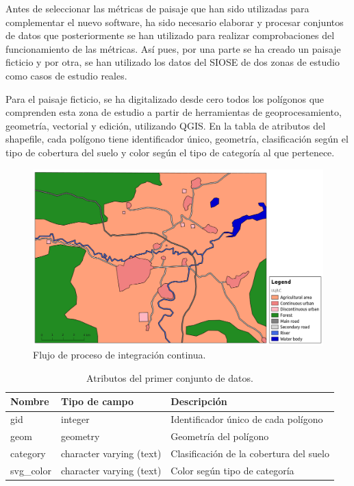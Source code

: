 Antes de seleccionar las métricas de paisaje que han sido utilizadas para complementar el nuevo software, ha sido necesario elaborar y procesar conjuntos de datos que posteriormente se han utilizado para realizar comprobaciones del funcionamiento de las métricas. Así pues, por una parte se ha creado un paisaje ficticio y por otra, se han utilizado los datos del SIOSE de dos zonas de estudio como casos de estudio reales.

Para el paisaje ficticio, se ha digitalizado desde cero todos los polígonos que comprenden esta zona de estudio a partir de herramientas de geoprocesamiento, geometría, vectorial y edición, utilizando QGIS. En la tabla de atributos del shapefile, cada polígono tiene identificador único, geometría, clasificación según el tipo de cobertura del suelo y color según el tipo de categoría al que pertenece.

\begin{figure}
\begin{center}
\includegraphics[width=\textwidth]{Metodologia/Figs/land_test.png}
\caption{Flujo de proceso de integración continua. \label{fig:lan_test}}
\end{center}
\end{figure}

\begin{table}[]
\centering
\caption{Atributos del primer conjunto de datos.}
\label{my-label}
\begin{tabular}{@{}lll@{}}
\toprule
\textbf{Nombre} & \textbf{Tipo de campo}   & \textbf{Descripción}                    \\ \midrule
gid             & integer                  & Identificador único de cada polígono    \\
geom            & geometry                 & Geometría del polígono                  \\
category        & character varying (text) & Clasificación de la cobertura del suelo \\
svg\_color      & character varying (text) & Color según tipo de categoría           \\ \bottomrule
\end{tabular}
\end{table}

